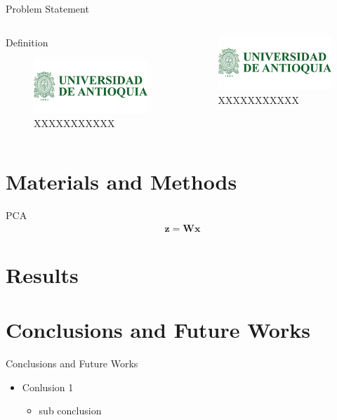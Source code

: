\documentclass{beamer}
\begin{document}
\begin{frame}{Problem Statement}
\begin{columns}
	\begin{column}{0.45\linewidth}
		\begin{block}{Definition}
			\begin{figure}
				\includegraphics[width=0.5\linewidth]{logos/logoUdeA}
				\caption{XXXXXXXXXXX}
			\end{figure}
		\end{block}
	\end{column}
	\begin{column}{0.45\linewidth}
		\begin{figure}
			\includegraphics[width=0.5\linewidth]{logos/logoUdeA}
			\caption{XXXXXXXXXXX}
		\end{figure}
	\end{column}
\end{columns}

\end{frame}
	
	\section{Materials and Methods}
	
	\begin{frame}{PCA}
	\begin{align}
	\mathbf{z} = \mathbf{W}\mathbf{x}
	\end{align}
\end{frame}
	\section{Results}
	\section{Conclusions and Future Works}
	
	\begin{frame}{Conclusions and Future Works}
\begin{itemize}
	\item Conlusion 1
	\begin{itemize}
		\item sub conclusion
	\end{itemize}
\end{itemize}
\end{frame}
\end{document}
